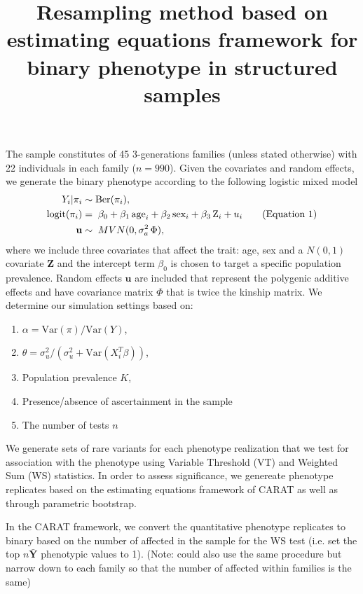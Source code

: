 \documentclass[11pt,a4paper]{article}
\title{Resampling method based on estimating equations framework for binary phenotype in structured samples}
\newcommand\numberthis{\stepcounter{equation}{}\tag{Equation \theequation}}
\begin{document}

The sample constitutes of 45 3-generations families (unless stated otherwise) with 22 individuals in each family ($n=990$). Given the covariates and random effects, we generate the binary phenotype according to the following logistic mixed model
\begin{align*}
Y_i|\pi_i &\sim \text{Ber}(\pi_i),\\
\text{logit}(\pi_i) &=  \;\beta_0 + \beta_1\, \text{age}_i + \beta_2\, \text{sex}_i + \beta_3\, \text{Z}_i + u_i\numberthis\\
 \mathbf{u} &\sim \; MVN(0, \sigma_a^2\, \Phi),
\end{align*}
where we include three covariates that affect the trait: age, sex and a $N(0,1)$ covariate $\mathbf{Z}$ and the intercept term $\beta_0$ is chosen to target a specific population prevalence. Random effects $\mathbf{u}$ are included that represent the polygenic additive effects and have covariance matrix $\Phi$ that is twice the kinship matrix. We determine our simulation settings based on:

\begin{enumerate}
\item $\alpha = \mathrm{Var}(\pi)/ \mathrm{Var}(Y)$,
\item $ \theta = \sigma_u^2 / (\sigma_u^2 + \mathrm{Var}(X_i^T\beta))$,
\item Population prevalence $K$,
\item Presence/absence of ascertainment in the sample
\item The number of tests $n$
\end{enumerate}


We generate sets of rare variants for each phenotype realization that we test for association with the phenotype using Variable Threshold (VT) and Weighted Sum (WS) statistics.  In order to assess significance, we genereate phenotype replicates based on the estimating equations framework of CARAT as well as through parametric bootstrap.

In the CARAT framework, we convert the quantitative phenotype replicates to binary based on the number of affected in the sample for the WS test (i.e. set the top $n\bar{\mathbf{Y}}$ phenotypic values to 1). (Note: could also use the same procedure but narrow down to each family so that the number of affected within families is the same)
\end{document}
